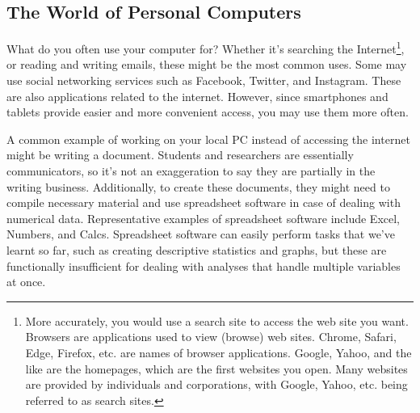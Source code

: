 \documentclass{ltjsbook}
\begin{document}
\subsection{The World of Personal Computers}
What do you often use your computer for? Whether it's searching the Internet\footnote{More accurately, you would use a search site to access the web site you want. Browsers are applications used to view (browse) web sites. Chrome, Safari, Edge, Firefox, etc. are names of browser applications. Google, Yahoo, and the like are the homepages, which are the first websites you open. Many websites are provided by individuals and corporations, with Google, Yahoo, etc. being referred to as search sites.}, or reading and writing emails, these might be the most common uses. Some may use social networking services such as Facebook, Twitter, and Instagram. These are also applications related to the internet. However, since smartphones and tablets provide easier and more convenient access, you may use them more often.

A common example of working on your local PC instead of accessing the internet might be writing a document. Students and researchers are essentially communicators, so it's not an exaggeration to say they are partially in the writing business. Additionally, to create these documents, they might need to compile necessary material and use spreadsheet software in case of dealing with numerical data. Representative examples of spreadsheet software include Excel, Numbers, and Calcs. Spreadsheet software can easily perform tasks that we've learnt so far, such as creating descriptive statistics and graphs, but these are functionally insufficient for dealing with analyses that handle multiple variables at once.
\end{document}
